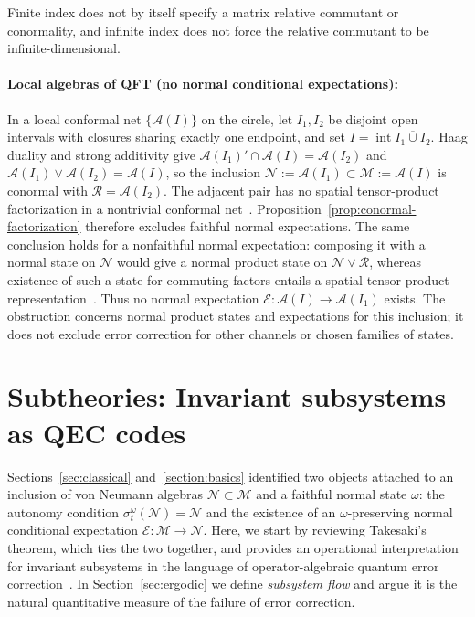\documentclass[a4paper,11pt]{article}
\theoremstyle{definition}
\newcommand{\mN}{\mathcal{N}}
\newcommand{\mM}{\mathcal{M}}
\newcommand{\mE}{\mathcal{E}}
\begin{document}
Finite index does not by itself specify a matrix relative commutant or conormality, and infinite index does not force the relative commutant to be infinite-dimensional.

\paragraph{Local algebras of QFT (no normal conditional expectations):}
In a local conformal net $\{\mathcal{A}(I)\}$ on the circle, let $I_1,I_2$ be disjoint
open intervals with closures sharing exactly one endpoint, and set $I=\operatorname{int}\overline{I_1\cup I_2}$.
Haag duality and strong additivity give $\mathcal{A}(I_1)'\cap\mathcal{A}(I)=\mathcal{A}(I_2)$
and $\mathcal{A}(I_1)\vee\mathcal{A}(I_2)=\mathcal{A}(I)$, so the inclusion
$\mathcal N:=\mathcal{A}(I_1)\subset\mathcal{M}:=\mathcal{A}(I)$ is conormal with
$\mathcal R=\mathcal A(I_2)$. The adjacent pair has no spatial tensor-product
factorization in a nontrivial conformal net~\cite{Wiesbrock1993}.
Proposition~\ref{prop:conormal-factorization} therefore excludes faithful normal
expectations. The same conclusion holds for a nonfaithful normal expectation:
composing it with a normal state on $\mathcal N$ would give a normal product
state on $\mathcal N\vee\mathcal R$, whereas existence of such a state for commuting
factors entails a spatial tensor-product representation~\cite{DoplicherLongo1984}.
Thus no normal expectation $\mE:\mathcal A(I)\to\mathcal A(I_1)$ exists.
The obstruction concerns normal product states and expectations for this inclusion;
it does not exclude error correction for other channels or chosen families of states.


\section{Subtheories: Invariant subsystems as QEC codes}\label{sec:QEC}

Sections~\ref{sec:classical} and~\ref{section:basics} identified two objects attached to an inclusion of von Neumann algebras $\mN\subset \mM$ and a faithful normal state $\omega$: the autonomy condition $\sigma^{\omega}_t(\mathcal N)=\mathcal N$ and the existence of an $\omega$-preserving normal conditional expectation $\mE:\mathcal M\to\mathcal N$. Here, we start by reviewing Takesaki's theorem, which ties the two together, and provides an operational interpretation for invariant subsystems in the language of operator-algebraic quantum error correction~\cite{Faulkner2020,FaulknerSperanza2024}. In Section~\ref{sec:ergodic} we define {\it subsystem flow} and argue it is the natural quantitative measure of the failure of error correction.
\end{document}
